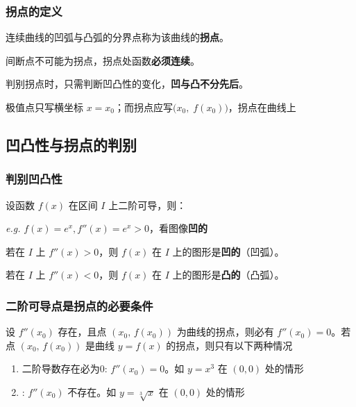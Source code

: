 \documentclass[../book.tex]{subfiles}
\begin{document}
    \subsubsection{拐点的定义}

    连续曲线的凹弧与凸弧的分界点称为该曲线的\textbf{拐点}。

    \begin{circlenum}
        \item 间断点不可能为拐点，拐点处函数\textbf{必须连续}。

        \item 判别拐点时，只需判断凹凸性的变化，\textbf{凹与凸不分先后}。

        \item 极值点只写横坐标 $x=x_0$；而拐点应写$\bigl(x_0,\; f(x_0)\bigr)$，拐点在曲线上
    \end{circlenum}

    \subsection{凹凸性与拐点的判别}

    \subsubsection{判别凹凸性}

    设函数 $f(x)$ 在区间 $I$ 上二阶可导，则：

    \begin{circlenum}
        \item \emph{e.g.} $f(x) = e^x, f''(x) = e^x > 0$，看图像\textbf{凹的}
        \item 若在 $I$ 上 $f''(x) > 0$，则 $f(x)$ 在 $I$ 上的图形是\textbf{凹的}（凹弧）。
        \item 若在 $I$ 上 $f''(x) < 0$，则 $f(x)$ 在 $I$ 上的图形是\textbf{凸的}（凸弧）。
    \end{circlenum}

    \subsubsection{二阶可导点是拐点的必要条件}

    设 $f''(x_0)$ 存在，且点 $(x_0,\,f(x_0))$ 为曲线的拐点，则必有 $f''(x_0)=0$。若点 $(x_0,\,f(x_0))$ 是曲线 $y = f(x)$ 的拐点，则只有以下两种情况

    \begin{enumerate}
        \item 二阶导数存在必为$0$: $f''(x_0)=0$。如 $y=x^3$ 在 $(0,0)$ 处的情形
        \item {\color{red}{二阶导数不存在的点也有可能是拐点}}: $f''(x_0)$ 不存在。如 $y=\sqrt[3]{x}$ 在 $(0,0)$ 处的情形
    \end{enumerate}
\end{document}
